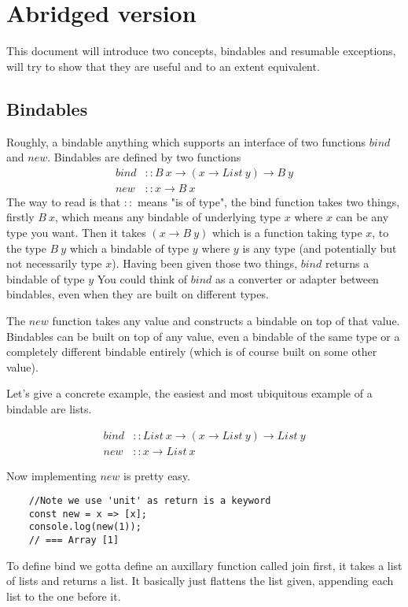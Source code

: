 \section{Abridged version}
This document will introduce two concepts,
bindables and resumable exceptions,
will try to show that they are useful
and to an extent equivalent.

\subsection{Bindables}
Roughly, a bindable anything which supports an
interface of two functions $bind$ and $new$.
Bindables are defined by two functions
\begin{align}
    bind &:: B\ x \rightarrow (x \rightarrow List\ y) \rightarrow B\ y\\
    new &:: x \rightarrow B\ x
\end{align}
The way to read is that $::$ means "is of type",
the bind function takes two things,
firstly $B\ x$, which means any bindable of underlying type $x$
where $x$ can be any type you want.
Then it takes $(x \rightarrow B\ y)$ which
is a function taking type $x$,
to the type $B\ y$ which a bindable of type $y$
where $y$ is any type
(and potentially but not necessarily type $x$).
Having been given those two things,
$bind$ returns a bindable of type $y$
You could think of $bind$ as a converter
or adapter between bindables,
even when they are built on different types.

The $new$ function takes any value and
constructs a bindable on top of that value.
Bindables can be built on top of any value,
even a bindable of the same type
or a completely different bindable entirely
(which is of course built on some other value).

Let's give a concrete example,
the easiest and most ubiquitous example of a bindable are lists.

\begin{align}
    bind &:: List\ x \rightarrow (x \rightarrow List\ y) \rightarrow List\ y\\
    new &:: x \rightarrow List\ x
\end{align}

Now implementing $new$ is pretty easy.
\begin{verbatim}
    //Note we use 'unit' as return is a keyword
    const new = x => [x];
    console.log(new(1));
    // === Array [1]
\end{verbatim}

To define bind we gotta define an auxillary function called join first,
it takes a list of lists and returns a list.
It basically just flattens the list given,
appending each list to the one before it.

